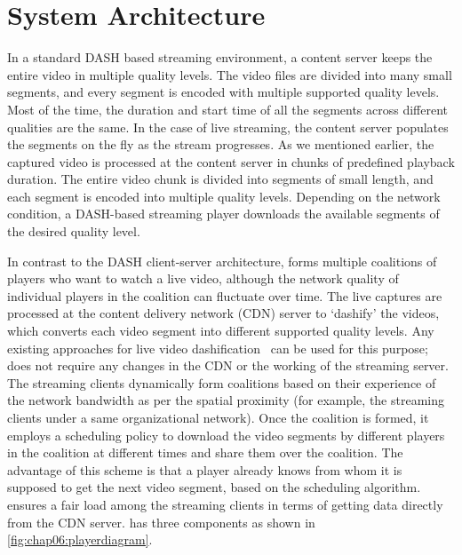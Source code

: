 \section{System Architecture}
\label{sec:chap06:systemDesign}
In a standard DASH based streaming environment, a content server keeps the entire video in multiple quality levels. The video files are divided into many small segments, and every segment is encoded with multiple supported quality levels. Most of the time, the duration and start time of all the segments across different qualities are the same. In the case of live streaming, the content server populates the segments on the fly as the stream progresses. As we mentioned earlier, the captured video is processed at the content server in chunks of predefined playback duration. The entire video chunk is divided into segments of small length, and each segment is encoded into multiple quality levels. Depending on the network condition, a DASH-based streaming player downloads the available segments of the desired quality level.

In contrast to the DASH client-server architecture, {\our} forms multiple coalitions of players who want to watch a live video, although the network quality of individual players in the coalition can fluctuate over time. %
The live captures are processed at the content delivery network (CDN) server to `dashify' the videos, which converts each video segment into different supported quality levels. Any existing approaches for live video dashification~\cite{wei2014low,pires2014dash} can be used for this purpose; {\our} does not require any changes in the CDN or the working of the streaming server. The streaming clients dynamically form coalitions based on their experience of the network bandwidth as per the spatial proximity (for example, the streaming clients under a same organizational network). Once the coalition is formed, it employs a scheduling policy to download the video segments by different players in the coalition at different times and share them over the coalition. The advantage of this scheme is that a player already knows from whom it is supposed to get the next video segment, based on the scheduling algorithm. {\our} ensures a fair load among the streaming clients in terms of getting data directly from the CDN server.
{\our} has three components as shown in \fig\ref{fig:chap06:playerdiagram}.

